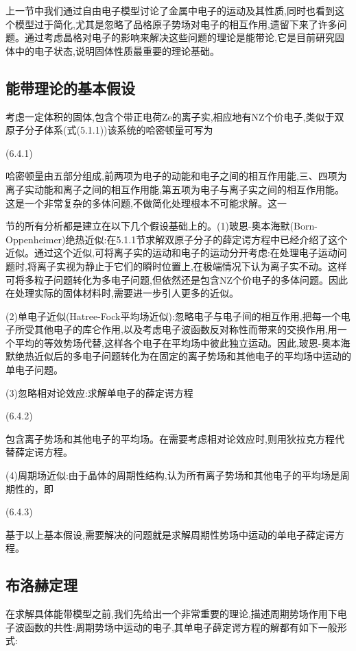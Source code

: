 上一节中我们通过自由电子模型讨论了金属中电子的运动及其性质,同时也看到这个模型过于简化,尤其是忽略了品格原子势场对电子的相互作用,遗留下来了许多问题。通过考虑晶格对电子的影响来解决这些问题的理论是能带论,它是目前研究固体中的电子状态,说明固体性质最重要的理论基础。

\subsection{能带理论的基本假设}

考虑一定体积的固体,包含个带正电荷Ze的离子实,相应地有NZ个价电子,类似于双原子分子体系(式(5.1.1))该系统的哈密顿量可写为

 	(6.4.1)

哈密顿量由五部分组成,前两项为电子的动能和电子之间的相互作用能,三、四项为离子实动能和离子之间的相互作用能,第五项为电子与离子实之间的相互作用能。这是一个非常复杂的多体问题,不做简化处理根本不可能求解。这一

节的所有分析都是建立在以下几个假设基础上的。(1)玻恩-奥本海默(Born-Oppenheimer)绝热近似:在5.1.1节求解双原子分子的薛定谔方程中已经介绍了这个近似。通过这个近似,可将离子实的运动和电子的运动分开考虑:在处理电子运动问题时,将离子实视为静止于它们的瞬时位置上,在极端情况下认为离子实不动。这样可将多粒子问题转化为多电子问题,但依然还是包含NZ个价电子的多体问题。因此在处理实际的固体材料时,需要进一步引人更多的近似。

(2)单电子近似(Hatree-Fock平均场近似):忽略电子与电子间的相互作用,把每一个电子所受其他电子的库仑作用,以及考虑电子波函数反对称性而带来的交换作用,用一个平均的等效势场代替,这样各个电子在平均场中彼此独立运动。因此,玻恩-奥本海默绝热近似后的多电子问题转化为在固定的离子势场和其他电子的平均场中运动的单电子问题。

(3)忽略相对论效应:求解单电子的薛定谔方程

 	(6.4.2)

包含离子势场和其他电子的平均场。在需要考虑相对论效应时,则用狄拉克方程代替薛定谔方程。

(4)周期场近似:由于晶体的周期性结构,认为所有离子势场和其他电子的平均场是周期性的，即

 	(6.4.3)

基于以上基本假设,需要解决的问题就是求解周期性势场中运动的单电子薛定谔方程。

\subsection{布洛赫定理}

在求解具体能带模型之前,我们先给出一个非常重要的理论,描述周期势场作用下电子波函数的共性:周期势场中运动的电子,其单电子薛定谔方程的解都有如下一般形式:

